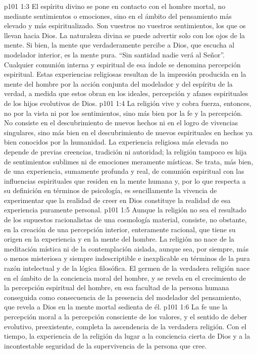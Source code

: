 \vs p101 1:3 El espíritu divino se pone en contacto con el hombre mortal, no mediante sentimientos o emociones, sino en el ámbito del pensamiento más elevado y más espiritualizado. Son vuestros  no vuestros sentimientos, los que os llevan hacia Dios. La naturaleza divina se puede advertir solo con los ojos de la mente. Si bien, la mente que verdaderamente percibe a Dios, que escucha al modelador interior, es la mente pura. “Sin santidad nadie verá al Señor”. Cualquier comunión interna y espiritual de esa índole se denomina percepción espiritual. Estas experiencias religiosas resultan de la impresión producida en la mente del hombre por la acción conjunta del modelador y del espíritu de la verdad, a medida que estos obran en los ideales, percepción y afanes espirituales de los hijos evolutivos de Dios.
\vs p101 1:4 La religión vive y cobra fuerza, entonces, no por la vista ni por los sentimientos, sino más bien por la fe y la percepción. No consiste en el descubrimiento de nuevos hechos ni en el logro de vivencias singulares, sino más bien en el descubrimiento de nuevos  espirituales en hechos ya bien conocidos por la humanidad. La experiencia religiosa más elevada no depende de previas creencias, tradición ni autoridad; la religión tampoco es hija de sentimientos sublimes ni de emociones meramente místicas. Se trata, más bien, de una experiencia, sumamente profunda y real, de comunión espiritual con las influencias espirituales que residen en la mente humana y, por lo que respecta a su definición en términos de psicología, es sencillamente la vivencia de experimentar que la realidad de creer en Dios constituye la realidad de esa experiencia puramente personal.
\vs p101 1:5 \pc Aunque la religión no sea el resultado de los supuestos racionalistas de una cosmología material, consiste, no obstante, en la creación de una percepción interior, enteramente racional, que tiene su origen en la experiencia y en la mente del hombre. La religión no nace de la meditación mística ni de la contemplación aislada, aunque sea, por siempre, más o menos misteriosa y siempre indescriptible e inexplicable en términos de la pura razón intelectual y de la lógica filosófica. El germen de la verdadera religión nace en el ámbito de la conciencia moral del hombre, y se revela en el crecimiento de la percepción espiritual del hombre, en esa facultad de la persona humana conseguida como consecuencia de la presencia del modelador del pensamiento, que revela a Dios en la mente mortal sedienta de él.
\vs p101 1:6 La fe une la percepción moral a la percepción consciente de los valores, y el sentido de deber evolutivo, preexistente, completa la ascendencia de la verdadera religión. Con el tiempo, la experiencia de la religión da lugar a la conciencia cierta de Dios y a la incontestable seguridad de la supervivencia de la persona que cree.

